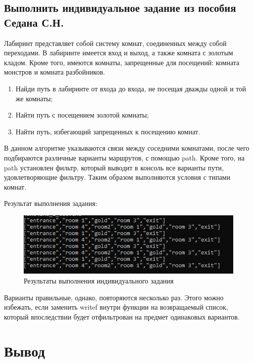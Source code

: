 \documentclass[14pt,a4paper,report]{report}
\begin{document}
\subsection{Выполнить индивидуальное задание из пособия Седана С.Н.}

Лабиринт представляет собой систему комнат, соединенных между собой переходами. В лабиринте имеется вход и выход, а также комната с золотым кладом. Кроме того, имеются комнаты, запрещенные для посещений: комната монстров и комната разбойников.

\begin{enumerate}
	\item Найди путь в лабиринте от входа до входа, не посещая дважды одной и той же комнаты;
	\item Найти путь с посещением золотой комнаты;
	\item Найти путь, избегающий запрещенных к посещению комнат.
\end{enumerate}



В данном алгоритме указываются связи между соседними комнатами, после чего подбираются различные варианты маршрутов, с помощью path. Кроме того, на path установлен фильтр, который выводит в консоль все варианты пути, удовлетворяющие фильтру. Таким образом выполняются условия с типами комнат.

Результат выполнения задания:

\begin{figure}[h!]
	\centering
	\includegraphics[scale = 1.0]{images/i2.png}
	\caption{Результаты выполнения индивидуального задания}
\end{figure}

Варианты правильные, однако, повторяются несколько раз. Этого можно избежать, если заменить writef внутри функции на возвращаемый список, который впоследствии будет отфильтрован на предмет одинаковых вариантов.


\section{Вывод}
\end{document}
